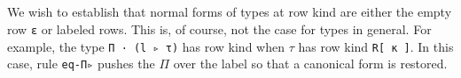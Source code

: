 \documentclass[authoryear, acmsmall, screen, review, nonacm]{acmart}
\begin{document}
\begin{code}%
%
\>[2]\AgdaSpace{}%
\AgdaSymbol{:}\AgdaSpace{}%
\AgdaSymbol{\{}\AgdaSpace{}%
\AgdaSymbol{:}\AgdaSpace{}%
\AgdaSpace{}%
\AgdaSpace{}%
\AgdaSymbol{(}\AgdaSpace{}%
\AgdaSpace{}%
\AgdaSymbol{)\}}\AgdaSpace{}%
\<%
\\
\>[2][@{}l@{\AgdaIndent{0}}]%
\>[4]\AgdaSymbol{(}\AgdaSpace{}%
\AgdaOperator{\AgdaInductiveConstructor{<\$>}}\AgdaSpace{}%
\AgdaSymbol{)}\AgdaSpace{}%
\AgdaSpace{}%
\<%
\\
%
\\[\AgdaEmptyExtraSkip]%
%
\>[2]\AgdaSpace{}%
\AgdaSymbol{:}\AgdaSpace{}%
\AgdaSpace{}%
\AgdaSymbol{\{}\AgdaSymbol{\}}\AgdaSpace{}%
\AgdaSymbol{\{}\AgdaSpace{}%
\AgdaSymbol{:}\AgdaSpace{}%
\AgdaSpace{}%
\AgdaSpace{}%
\AgdaSymbol{\}}\AgdaSpace{}%
\AgdaSymbol{\{}\AgdaSpace{}%
\AgdaSymbol{:}\AgdaSpace{}%
\AgdaSpace{}%
\AgdaSpace{}%
\AgdaSymbol{(}\AgdaSpace{}%
\AgdaSpace{}%
\AgdaSymbol{)\}}\AgdaSpace{}%
\<%
\\
\>[2][@{}l@{\AgdaIndent{0}}]%
\>[4]\AgdaSymbol{(}\AgdaSpace{}%
\AgdaOperator{\AgdaInductiveConstructor{<\$>}}\AgdaSpace{}%
\AgdaSymbol{(}\AgdaSpace{}%
\AgdaSpace{}%
\AgdaSymbol{))}\AgdaSpace{}%
\AgdaSpace{}%
\AgdaSymbol{(}\AgdaSpace{}%
\AgdaSpace{}%
\AgdaSymbol{(}\AgdaSpace{}%
\AgdaSpace{}%
\AgdaSymbol{))}\<%
\end{code}

We wish to establish that normal forms of types at row kind are either the empty row \verb!ε! or labeled rows. This is, of course, not the case for types in general. For example, the type \verb!Π · (l ▹ τ)! has row kind when $\tau$ has row kind \verb!R[ κ ]!. In this case, rule \verb!eq-Π▹! pushes the $\Pi$ over the label so that a canonical form is restored.
\end{document}
